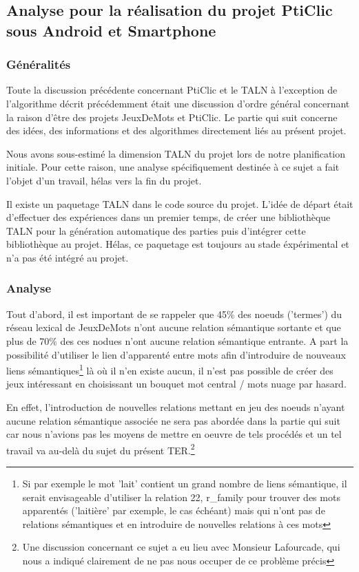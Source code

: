 \documentclass[a4paper,11pt,french]{article}
\begin{document}
\subsection{Analyse pour la réalisation du projet PtiClic sous Android et Smartphone}

\subsubsection{Généralités}

Toute la discussion précédente concernant PtiClic et le TALN à l'exception de l'algorithme décrit précédemment était une discussion d'ordre général concernant la raison d'être des projets JeuxDeMots et PtiClic. Le partie qui suit concerne des idées, des informations et des algorithmes directement liés au présent projet.

Nous avons sous-estimé la dimension TALN du projet lors de notre planification initiale. Pour cette raison, une analyse spécifiquement destinée à ce sujet a fait l'objet d'un travail, hélas vers la fin du projet. 

Il existe un paquetage TALN dans le code source du projet. L'idée de départ était d'effectuer des expériences dans un premier temps, de créer une bibliothèque TALN pour la génération automatique des parties puis d'intégrer cette bibliothèque au projet. Hélas, ce paquetage est toujours au stade éxpérimental et n'a pas été intégré au projet.   

\subsubsection{Analyse}

Tout d'abord, il est important de se rappeler que 45\% des noeuds ('termes') du réseau lexical de JeuxDeMots n'ont aucune relation sémantique sortante et que plus de 70\% des ces nodues n'ont aucune relation sémantique entrante. A part la possibilité d'utiliser le lien d'apparenté entre mots afin d'introduire de nouveaux liens sémantiques\footnote{Si par exemple le mot 'lait' contient un grand nombre de liens sémantique, il serait envisageable d'utiliser la relation 22, r\_family pour trouver des mots apparentés ('laitière' par exemple, le cas échéant) mais qui n'ont pas de relations sémantiques et en introduire de nouvelles relations à ces mots} là où il n'en existe aucun, il n'est pas possible de créer des jeux intéressant en choisissant un bouquet mot central / mots nuage par hasard. 

En effet, l'introduction de nouvelles relations mettant en jeu des noeuds n'ayant aucune relation sémantique associée ne sera pas abordée dans la partie qui suit car nous n'avions pas les moyens de mettre en oeuvre de tels procédés et un tel travail va au-delà du sujet du présent TER.\footnote{Une discussion concernant ce sujet a eu lieu avec Monsieur Lafourcade, qui nous a indiqué clairement de ne pas nous occuper de ce problème précis}  
\end{document}
